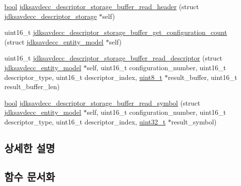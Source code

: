\begin{DoxyCompactItemize}
\item 
\hyperlink{avb__gptp_8h_af6a258d8f3ee5206d682d799316314b1}{bool} \hyperlink{group__jdksavdecc__descriptor__storage_ga7c0f7088936576fa27511da7fde01a1a}{jdksavdecc\+\_\+descriptor\+\_\+storage\+\_\+buffer\+\_\+read\+\_\+header} (struct \hyperlink{structjdksavdecc__descriptor__storage}{jdksavdecc\+\_\+descriptor\+\_\+storage} $\ast$self)
\item 
uint16\+\_\+t \hyperlink{group__jdksavdecc__descriptor__storage_gaf481852d6558c9f414162824c93d781b}{jdksavdecc\+\_\+descriptor\+\_\+storage\+\_\+buffer\+\_\+get\+\_\+configuration\+\_\+count} (struct \hyperlink{structjdksavdecc__entity__model}{jdksavdecc\+\_\+entity\+\_\+model} $\ast$self)
\item 
uint16\+\_\+t \hyperlink{group__jdksavdecc__descriptor__storage_gaf9627c1f35647ec53353aea3506ea100}{jdksavdecc\+\_\+descriptor\+\_\+storage\+\_\+buffer\+\_\+read\+\_\+descriptor} (struct \hyperlink{structjdksavdecc__entity__model}{jdksavdecc\+\_\+entity\+\_\+model} $\ast$self, uint16\+\_\+t configuration\+\_\+number, uint16\+\_\+t descriptor\+\_\+type, uint16\+\_\+t descriptor\+\_\+index, \hyperlink{stdint_8h_aba7bc1797add20fe3efdf37ced1182c5}{uint8\+\_\+t} $\ast$result\+\_\+buffer, uint16\+\_\+t result\+\_\+buffer\+\_\+len)
\item 
\hyperlink{avb__gptp_8h_af6a258d8f3ee5206d682d799316314b1}{bool} \hyperlink{group__jdksavdecc__descriptor__storage_ga37f13bb444e21c5244641d43ddf35419}{jdksavdecc\+\_\+descriptor\+\_\+storage\+\_\+buffer\+\_\+read\+\_\+symbol} (struct \hyperlink{structjdksavdecc__entity__model}{jdksavdecc\+\_\+entity\+\_\+model} $\ast$self, uint16\+\_\+t configuration\+\_\+number, uint16\+\_\+t descriptor\+\_\+type, uint16\+\_\+t descriptor\+\_\+index, \hyperlink{parse_8c_a6eb1e68cc391dd753bc8ce896dbb8315}{uint32\+\_\+t} $\ast$result\+\_\+symbol)
\end{DoxyCompactItemize}


\subsection{상세한 설명}


\subsection{함수 문서화}
